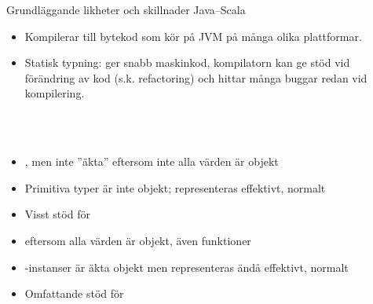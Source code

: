 \begin{Slide}{Grundläggande likheter och skillnader Java--Scala}\SlideFontSmall
{}
\begin{itemize}\SlideFontTiny
\item Kompilerar till bytekod som kör på JVM på många olika plattformar.
\item Statisk typning: ger snabb maskinkod, kompilatorn kan ge stöd vid förändring av kod (s.k. refactoring) och hittar många buggar redan vid kompilering.
\end{itemize}

\noindent {} 
\ifkompendium
\\~\\
\else
\vspace{-1em}\begin{multicols}{2}
\fi
{}
\begin{itemize}\SlideFontTiny
\item {}, men inte ''äkta''  eftersom inte alla värden är objekt

\item Primitiva typer är inte objekt; representeras effektivt, normalt 

\item Visst stöd för 

\end{itemize}

\ifkompendium\else
\columnbreak
\fi

\noindent{}
\begin{itemize}\SlideFontTiny
\item {} eftersom alla värden är objekt, även funktioner

\item {}-instanser är äkta objekt men representeras ändå effektivt, normalt 

\item Omfattande stöd för 

\end{itemize}
\ifkompendium\else
\end{multicols}
\fi
\end{Slide}



